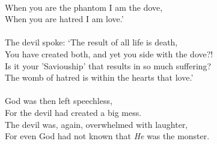 \documentclass{Report}
\begin{document}
\\When you are the phantom I am the dove,
\\When you are hatred I am love.'
\\
\\The devil spoke: `The result of all life is death,
\\You have created both, and yet you side with the dove?!
\\Is it your 'Saviouship' that results in so much suffering?
\\The womb of hatred is within the hearts that love.'
\\
\\God was then left speechless,
\\For the devil had created a big mess.
\\The devil was, again, overwhelmed with laughter,
\\For even God had not known that \textit{He} was the monster.
\end{document}
